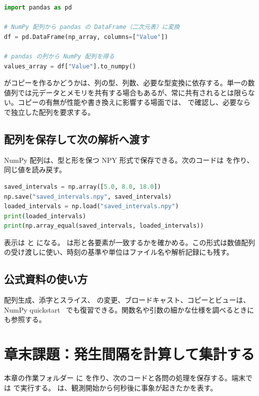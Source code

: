 \begin{lstlisting}[language=Python]
import pandas as pd

# NumPy 配列から pandas の DataFrame（二次元表）に変換
df = pd.DataFrame(np_array, columns=["Value"])

# pandas の列から NumPy 配列を得る
values_array = df["Value"].to_numpy()
\end{lstlisting}

 がコピーを作るかどうかは、列の型、列数、必要な型変換に依存する。単一の数値列では元データとメモリを共有する場合もあるが、常に共有されるとは限らない。コピーの有無が性能や書き換えに影響する場面では、 で確認し、必要なら  で独立した配列を要求する。

\subsection{配列を保存して次の解析へ渡す}

NumPy 配列は、型と形を保つ NPY 形式で保存できる。次のコードは  を作り、同じ値を読み戻す。

\begin{lstlisting}[language=Python]
saved_intervals = np.array([5.0, 8.0, 18.0])
np.save("saved_intervals.npy", saved_intervals)
loaded_intervals = np.load("saved_intervals.npy")
print(loaded_intervals)
print(np.array_equal(saved_intervals, loaded_intervals))
\end{lstlisting}

表示は \code{[5., 8., 18.]} と  になる。 は形と各要素が一致するかを確かめる。この形式は数値配列の受け渡しに使い、時刻の基準や単位はファイル名や解析記録にも残す。

\subsection{公式資料の使い方}

配列生成、添字とスライス、 の変更、ブロードキャスト、コピーとビューは、NumPy quickstart~\cite{numpy_quickstart} でも復習できる。関数名や引数の細かな仕様を調べるときにも参照する。

\section{章末課題：発生間隔を計算して集計する}

本章の作業フォルダー  に  を作り、次のコードと各問の処理を保存する。端末では  で実行する。 は、観測開始から何秒後に事象が起きたかを表す。

